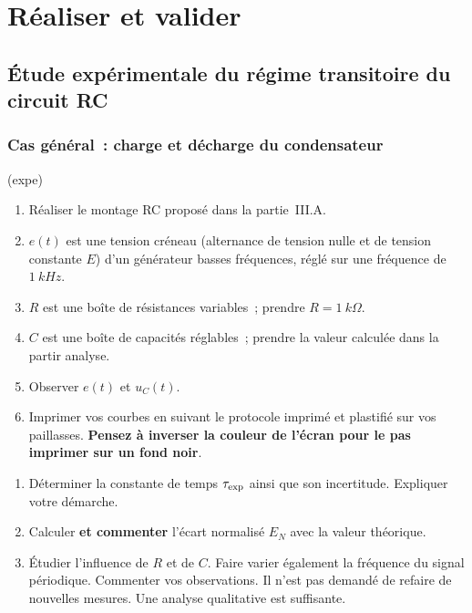 \documentclass[../main/main.tex]{subfiles}
\begin{document}
\section{Réaliser et valider}
\subsection{Étude expérimentale du régime transitoire du circuit RC}

\subsubsection{Cas général~: charge et décharge du condensateur}

\begin{tcb}(expe){}
	\begin{enumerate}
		\item Réaliser le montage RC proposé dans la partie~III.A.
		\item $e(t)$ est une tension créneau (alternance de tension nulle et de
		      tension constante $E$) d'un générateur basses fréquences, réglé sur une
		      fréquence de $\SI{1}{kHz}$.
		\item $R$ est une boîte de résistances variables~; prendre $R =
			      \SI{1}{k\Omega}$.
		\item $C$ est une boîte de capacités réglables~; prendre la valeur calculée
		      dans la partir analyse.
		\item Observer $e(t)$ et $u_{C}(t)$.
		\item Imprimer vos courbes en suivant le protocole imprimé et plastifié sur
		      vos paillasses. \textbf{Pensez à inverser la couleur de l'écran pour
			      le pas imprimer sur un fond noir}.
	\end{enumerate}
\end{tcb}

\begin{enumerate}[label=\sqenumi]
	\item Déterminer la constante de temps $\tau_{\rm exp}$ ainsi que son
	      incertitude. Expliquer votre démarche.
	\item Calculer \textbf{et commenter} l'écart normalisé $E_N$ avec la valeur
	      théorique.
	\item Étudier l'influence de $R$ et de $C$. Faire varier également la
	      fréquence du signal périodique. Commenter vos observations. Il n'est pas
	      demandé de refaire de nouvelles mesures. Une analyse qualitative est
	      suffisante.
\end{enumerate}
\end{document}
